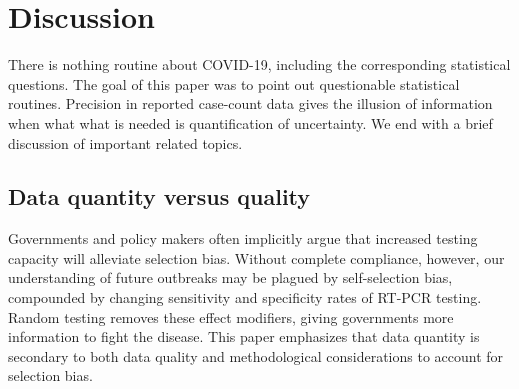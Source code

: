 \documentclass[11pt]{amsart}
\numberwithin{equation}{section}
\theoremstyle{plain}
\begin{document}
 \section{Discussion}
 \label{section:discussion}

 There is nothing routine about COVID-19, including the corresponding statistical questions.  The goal of this paper was to point out questionable statistical routines.  Precision in reported case-count data gives the illusion of information when what what is needed is quantification of uncertainty. 
We end with a brief discussion of important related topics.

 \subsection*{Data quantity versus quality}

 Governments and policy makers often implicitly argue that increased testing capacity will alleviate selection bias.  Without complete compliance, however, our understanding of future outbreaks may be plagued by self-selection bias, compounded by changing sensitivity and specificity rates of RT-PCR testing. Random testing removes these effect modifiers, giving governments more information to fight the disease.  This paper emphasizes that data quantity is secondary to both data quality and methodological considerations to account for selection bias.

\end{document}
